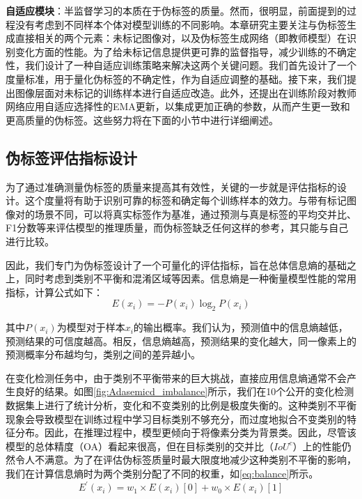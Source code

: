\documentclass[lang=chs, degree=master, blindreview=false, adobe=false]{yanputhesis}
\begin{document}
\textbf{自适应模块}：半监督学习的本质在于伪标签的质量。然而，很明显，前面提到的过程没有考虑到不同样本个体对模型训练的不同影响。本章研究主要关注与伪标签生成直接相关的两个元素：未标记图像对，以及伪标签生成网络（即教师模型）在识别变化方面的性能。为了给未标记信息提供更可靠的监督指导，减少训练的不确定性，我们设计了一种自适应训练策略来解决这两个关键问题。我们首先设计了一个度量标准，用于量化伪标签的不确定性，作为自适应调整的基础。接下来，我们提出图像层面对未标记的训练样本进行自适应改造。此外，还提出在训练阶段对教师网络应用自适应选择性的EMA更新，以集成更加正确的参数，从而产生更一致和更高质量的伪标签。这些努力将在下面的小节中进行详细阐述。
\subsection{伪标签评估指标设计}
为了通过准确测量伪标签的质量来提高其有效性，关键的一步就是评估指标的设计。这个度量将有助于识别可靠的标签和确定每个训练样本的效力。与带有标记图像对的场景不同，可以将真实标签作为基准，通过预测与真是标签的平均交并比、F1分数等来评估模型的推理质量，而伪标签缺乏任何这样的参考，其只能与自己进行比较。

因此，我们专门为伪标签设计了一个可量化的评估指标，旨在总体信息熵的基础之上，同时考虑到类别不平衡和混淆区域等因素。信息熵是一种衡量模型性能的常用指标，计算公式如下：
\begin{equation}
  \label{eq:entropy}
  E\left(x_{i}\right)=-P\left(x_{i}\right) \log _{2} P\left(x_{i}\right)
\end{equation}

其中$P\left(x_{i}\right)$为模型对于样本$x_{i}$的输出概率。我们认为，预测值中的信息熵越低，预测结果的可信度越高。相反，信息熵越高，预测结果的变化越大，同一像素上的预测概率分布越均匀，类别之间的差异越小。

在变化检测任务中，由于类别不平衡带来的巨大挑战，直接应用信息熵通常不会产生良好的结果。如图\ref{fig:Adasemicd_imbalance}所示，我们在10个公开的变化检测数据集上进行了统计分析，变化和不变类别的比例是极度失衡的。这种类别不平衡现象会导致模型在训练过程中学习目标类别不够充分，而过度地拟合不变类别的特征分布。因此，在推理过程中，模型更倾向于将像素分类为背景类。因此，尽管该模型的总体精度（OA）看起来很高，但在目标类别的交并比（$IoU^c$）上的性能仍然令人不满意。为了在评估伪标签质量时最大限度地减少这种类别不平衡的影响，我们在计算信息熵时为两个类别分配了不同的权重，如\autoref{eq:balance}所示。
\begin{equation}
  \label{eq:balance}
  E^{\prime}(x_i)=w_{1} \times E\left(x_{i}\right)[0]+w_{0} \times E\left(x_{i}\right)[1]
\end{equation}
\end{document}
